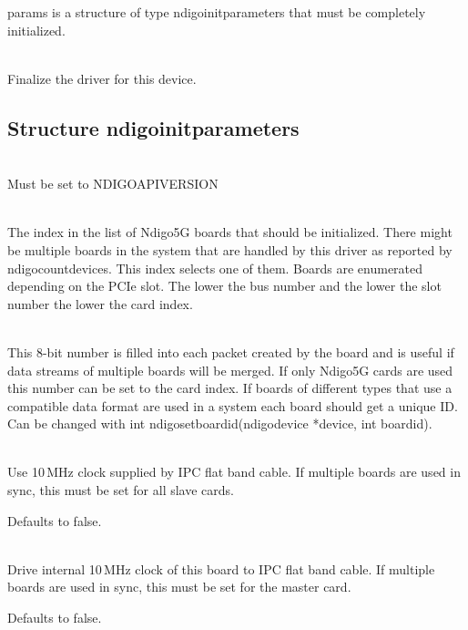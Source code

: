         \textsf{params} is a structure of type \textsf{ndigo\tu init\tu parameters} that must be completely initialized.\par

        \\
        Finalize the driver for this device.

        \subsection{Structure ndigo\tu init\tu parameters}

            \\
            Must be set to \textsf{NDIGO\tu API\tu VERSION}\par

            \\
            The index in the list of Ndigo5G boards that should be initialized. There might be multiple boards in the system that are handled by this driver as reported by \textsf{ndigo\tu count\tu devices}. This index selects one of them. Boards are enumerated depending on the PCIe slot. The lower the bus number and the lower the slot number the lower the card index.\par

            \\
            This 8-bit number is filled into each packet created by the board and is useful if data streams of multiple boards will be merged. If only Ndigo5G cards are used this number can be set to the card index. If boards of different types that use a compatible data format are used in a system each board should get a unique ID. Can be changed with \textsf{int ndigo\tu set\tu board\tu id(ndigo\tu device *device, int board\tu id)}.\par

            \\
            Use 10\,MHz clock supplied by IPC flat band cable. If multiple 
            boards are used in sync, this must be set for all slave cards.\par
            Defaults to false.\par

            \\
            Drive internal 10\,MHz clock of this board to IPC flat band cable. If multiple boards are used in sync, this must be set for the master card.\par
            Defaults to false.\par

